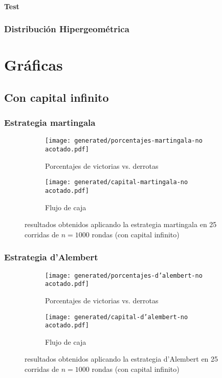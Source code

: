 \documentclass{article}
\begin{document}
  \paragraph{Test}

  \subsubsection{Distribución Hipergeométrica}

  \section{Gráficas}
  \subsection{Con capital infinito}
  \subsubsection{Estrategia martingala}
  \begin{figure}[H]
    \centering
    \begin{subfigure}{0.5\textwidth}
      \centering
      \texttt{[image: generated/porcentajes-martingala-no acotado.pdf]}
      \caption{Porcentajes de victorias vs. derrotas}
    \end{subfigure}%
	\begin{subfigure}{0.5\textwidth}
	  \centering
      \texttt{[image: generated/capital-martingala-no acotado.pdf]}
	  \caption{Flujo de caja}
	\end{subfigure}
	\caption{resultados obtenidos aplicando la estrategia martingala en 25 corridas de $n = 1000$ rondas (con capital infinito)}
  \end{figure}

  \subsubsection{Estrategia d’Alembert}
  \begin{figure}[H]
    \centering
    \begin{subfigure}{0.5\textwidth}
      \centering
      \texttt{[image: generated/porcentajes-d'alembert-no acotado.pdf]}
      \caption{Porcentajes de victorias vs. derrotas}
    \end{subfigure}%
    \begin{subfigure}{0.5\textwidth}
      \centering
      \texttt{[image: generated/capital-d'alembert-no acotado.pdf]}
      \caption{Flujo de caja}
    \end{subfigure}
    \caption{resultados obtenidos aplicando la estrategia d’Alembert en 25 corridas de $n = 1000$ rondas (con capital infinito)}
  \end{figure}
\end{document}
